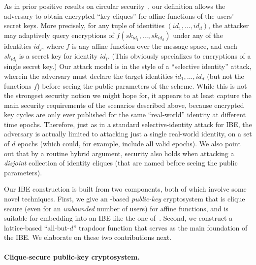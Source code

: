 As in prior positive results on circular
security~\cite{DBLP:conf/crypto/BonehHHO08,DBLP:conf/crypto/ApplebaumCPS09,DBLP:conf/crypto/BrakerskiG10},
our definition allows the adversary to obtain encrypted ``key
cliques'' for affine functions of the users' secret keys.  More
precisely, for any tuple of identities $(id_{1}, \ldots, id_{d})$, the
attacker may adaptively query encryptions of $f(sk_{id_{1}}, \ldots,
sk_{id_{d}})$ under any of the identities $id_{j}$, where $f$ is any
affine function over the message space, and each $sk_{id_{i}}$ is a
secret key for identity $id_{i}$.  (This obviously specializes to
encryptions of a single secret key.)  Our attack model is in the style
of a ``selective identity'' attack, wherein the adversary must declare
the target identities $id_{1}, \ldots, id_{d}$ (but not the functions
$f$) before seeing the public parameters of the scheme.  While this is
not the strongest security notion we might hope for, it appears to at
least capture the main security requirements of the scenarios
described above, because encrypted key cycles are only ever published
for the same ``real-world'' identity at different time epochs.
Therefore, just as in a standard selective-identity attack for IBE,
the adversary is actually limited to attacking just a single
real-world identity, on a set of $d$ epochs (which could, for example,
include all valid epochs).  We also point out that by a routine hybrid
argument, security also holds when attacking a \emph{disjoint}
collection of identity cliques (that are named before seeing the
public parameters).

Our IBE construction is built from two components, both of which
involve some novel techniques.  First, we give an \lwe-based
\emph{public-key} cryptosystem that is clique secure (even for an
\emph{unbounded} number of users) for affine functions, and is
suitable for embedding into an IBE like the one
of~\cite{DBLP:conf/stoc/GentryPV08}.  Second, we construct a
lattice-based ``all-but-$d$'' trapdoor function that serves as the
main foundation of the IBE.  We elaborate on these two contributions
next.

\paragraph{Clique-secure public-key cryptosystem.}

